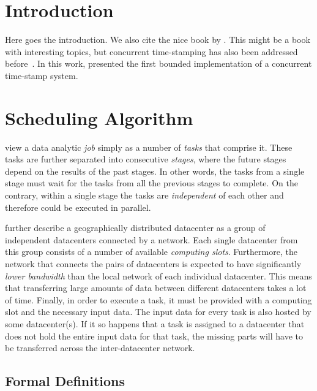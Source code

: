 
\theoremstyle{definition}
\newtheorem{definition}{Definition}[section]

\section{Introduction}

Here goes the introduction. We also cite the nice book by \citet{Pinedo:2012}.
This might be a book with interesting topics, but concurrent time-stamping has also been addressed before~\cite{Dolev97}.
In this work, \citet{Dolev97} presented the first bounded implementation of a concurrent time-stamp system.

\section{Scheduling Algorithm}

\citet*{Chen2017} view a data analytic \emph{job} simply as a number of \emph{tasks} that comprise it. These tasks are further separated into consecutive \emph{stages}, where the future stages depend on the results of the past stages. In other words, the tasks from a single stage must wait for the tasks from all the previous stages to complete. On the contrary, within a single stage the tasks are \emph{independent} of each other and therefore could be executed in parallel.

\citet{Chen2017} further describe a geographically distributed datacenter as a group of independent datacenters connected by a network. Each single datacenter from this group consists of a number of available \emph{computing slots}. Furthermore, the network that connects the pairs of datacenters is expected to have significantly \emph{lower bandwidth} than the local network of each individual datacenter. This means that transferring large amounts of data between different datacenters takes a lot of time. Finally, in order to execute a task, it must be provided with a computing slot and the necessary input data. The input data for every task is also hosted by some datacenter(s). If it so happens that a task is assigned to a datacenter that does not hold the entire input data for that task, the missing parts will have to be transferred across the inter-datacenter network.

\subsection{Formal Definitions}

